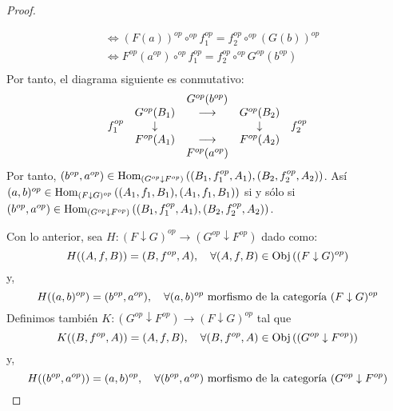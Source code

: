 \documentclass[12pt]{report}
\newcounter{it}
\theoremstyle{largebreak}
\newcommand\cf[3]{\ensuremath{#1:#2\rightarrow#3}}
\newcommand{\Obj}[1]{\ensuremath{\textup{Obj}\left(#1\right)}}
\newcommand{\Hom}[3]{\ensuremath{\textup{Hom}_{#1}\left(#2,#3\right)}}
\begin{document}
\begin{proof}
\begin{enumerate}
\begin{equation*}
\begin{split}
                    &\iff (F(a))^{op}\circ^{op}f_1^{op}=f_2^{op}\circ^{op}(G(b))^{op}\\
                    &\iff F^{op}(a^{op})\circ^{op}f_1^{op}=f_2^{op}\circ^{op}G^{op}(b^{op})\\
                \end{split}
            \end{equation*}
            Por tanto, el diagrama siguiente es conmutativo:
            \begin{equation*}
                \begin{array}[pos]{lcccr}
                    & & G^{op}(b^{op}) & & \\
                    & G^{op}(B_1) & \longrightarrow & G^{op}(B_2) & \\
                    f_1^{op} & \downarrow & & \downarrow & f_2^{op}\\
                    & F^{op}(A_1) & \longrightarrow & F^{op}(A_2) & \\
                    & & F^{op}(a^{op}) & & \\
                \end{array}
            \end{equation*}
            Por tanto, $(b^{op},a^{op})\in\Hom{(G^{op}\downarrow F^{op})}{(B_1,f_1^{op},A_1)}{(B_2,f_2^{op},A_2)}$. Así
            $(a,b)^{op}\in\Hom{(F\downarrow G)^{op}}{(A_1,f_1,B_1)}{(A_1,f_1,B_1)}$ si y sólo si $(b^{op},a^{op})\in\Hom{(G^{op}\downarrow F^{op})}{(B_1,f_1^{op},A_1)}{(B_2,f_2^{op},A_2)}$.
        \end{enumerate}
        Con lo anterior, sea $\cf{H}{(F\downarrow G)^{op}}{(G^{op}\downarrow F^{op})}$ dado como:
        \begin{equation*}
            H((A,f,B))=(B,f^{op},A),\quad\forall (A,f,B)\in\Obj{(F\downarrow G)^{op}}
        \end{equation*}
        y,
        \begin{equation*}
            H((a,b)^{op})=(b^{op},a^{op}),\quad\forall (a,b)^{op}\textup{ morfismo de la categoría }(F\downarrow G)^{op}
        \end{equation*}
        Definimos también $\cf{K}{(G^{op}\downarrow F^{op})}{(F\downarrow G)^{op}}$ tal que
        \begin{equation*}
            K((B,f^{op},A))=(A,f,B),\quad\forall (B,f^{op},A)\in\Obj{(G^{op}\downarrow F^{op})}
        \end{equation*}
        y,
        \begin{equation*}
            H((b^{op},a^{op}))=(a,b)^{op},\quad\forall (b^{op},a^{op})\textup{ morfismo de la categoría }(G^{op}\downarrow F^{op})

\end{equation*}
\end{proof}
\end{document}
